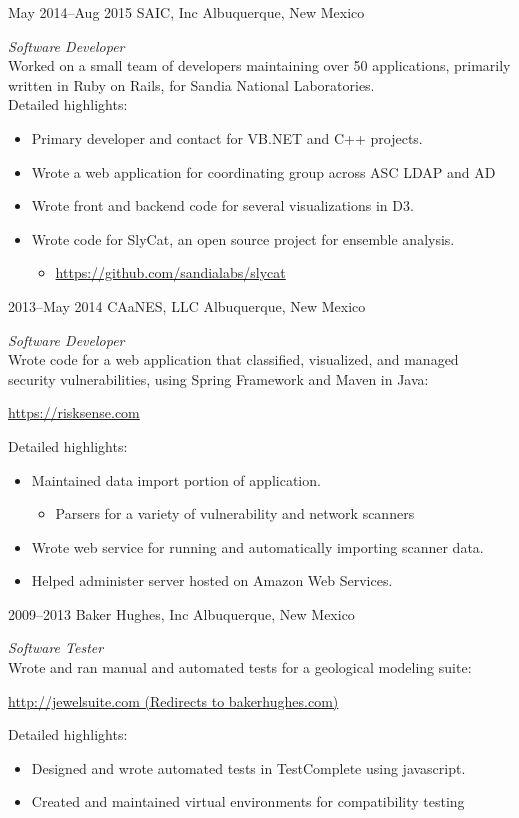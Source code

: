 \documentclass[]{friggeri-cv} %
\begin{document}
\begin{entrylist}
\entry
{May 2014--Aug 2015}
{SAIC, Inc}
{Albuquerque, New Mexico}
{\emph{Software Developer} \\
Worked on a small team of developers maintaining over 50 applications, primarily written in Ruby on Rails, for Sandia National Laboratories.\\
Detailed highlights:
\begin{itemize}
\item Primary developer and contact for VB.NET and C++ projects.
\item Wrote a web application for coordinating group across ASC LDAP and AD
\item Wrote front and backend code for several visualizations in D3.
\item Wrote code for SlyCat, an open source project for ensemble analysis.
\begin{itemize}
		\item \href{https://github.com/sandialabs/slycat}{https://github.com/sandialabs/slycat}
\end{itemize}
\end{itemize}
}
\entry
{2013--May 2014}
{CAaNES, LLC}
{Albuquerque, New Mexico}
{\emph{Software Developer} \\
Wrote code for a web application that classified, visualized, and managed\\ security vulnerabilities, using Spring Framework and Maven in Java:
\begin{center}
	\href{https://risksense.com}{https://risksense.com}
\end{center}
Detailed highlights:
\begin{itemize}
\item Maintained data import portion of application.
\begin{itemize}
	\item Parsers for a variety of vulnerability and network scanners
\end{itemize}
\item Wrote web service for running and automatically importing scanner data.
\item Helped administer server hosted on Amazon Web Services.
\end{itemize}}
\entry
{2009--2013}
{Baker Hughes, Inc}
{Albuquerque, New Mexico}
{\emph{Software Tester} \\
Wrote and ran manual and automated tests for a geological modeling suite:
\begin{center}
	\href{http://jewelsuite.com}{http://jewelsuite.com (Redirects to bakerhughes.com)}
\end{center}
Detailed highlights:
\begin{itemize}
\item Designed and wrote automated tests in TestComplete using javascript.
\item Created and maintained virtual environments for compatibility testing
\end{itemize}
}
\end{entrylist}
\end{document}
